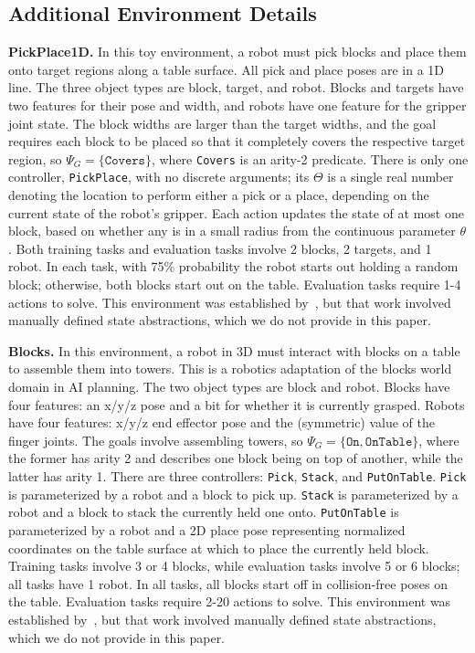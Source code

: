 \subsection{Additional Environment Details}
\label{app:details}

\begin{tightlist}
    \item \textbf{PickPlace1D.} In this toy environment, a robot must pick blocks and place them onto target regions along a table surface. All pick and place poses are in a 1D line. The three object types are block, target, and robot. Blocks and targets have two features for their pose and width, and robots have one feature for the gripper joint state. The block widths are larger than the target widths, and the goal requires each block to be placed so that it completely covers the respective target region, so $\Psi_G = \{\texttt{Covers}\}$, where \texttt{Covers} is an arity-2 predicate. There is only one controller, \texttt{PickPlace}, with no discrete arguments; its $\Theta$ is a single real number denoting the location to perform either a pick or a place, depending on the current state of the robot's gripper. Each action updates the state of at most one block, based on whether any is in a small radius from the continuous parameter $\theta$. Both training tasks and evaluation tasks involve 2 blocks, 2 targets, and 1 robot. In each task, with 75\% probability the robot starts out holding a random block; otherwise, both blocks start out on the table. Evaluation tasks require 1-4 actions to solve. This environment was established by~\citet{silver2021learning}, but that work involved manually defined state abstractions, which we do not provide in this paper.
    \item \textbf{Blocks.} In this environment, a robot in 3D must interact with blocks on a table to assemble them into towers. This is a robotics adaptation of the blocks world domain in AI planning. The two object types are block and robot. Blocks have four features: an x/y/z pose and a bit for whether it is currently grasped. Robots have four features: x/y/z end effector pose and the (symmetric) value of the finger joints. The goals involve assembling towers, so $\Psi_G = \{\texttt{On}, \texttt{OnTable}\}$, where the former has arity 2 and describes one block being on top of another, while the latter has arity 1. There are three controllers: \texttt{Pick}, \texttt{Stack}, and \texttt{PutOnTable}. \texttt{Pick} is parameterized by a robot and a block to pick up. \texttt{Stack} is parameterized by a robot and a block to stack the currently held one onto. \texttt{PutOnTable} is parameterized by a robot and a 2D place pose representing normalized coordinates on the table surface at which to place the currently held block. Training tasks involve 3 or 4 blocks, while evaluation tasks involve 5 or 6 blocks; all tasks have 1 robot. In all tasks, all blocks start off in collision-free poses on the table. Evaluation tasks require 2-20 actions to solve. This environment was established by~\citet{silver2021learning}, but that work involved manually defined state abstractions, which we do not provide in this paper.

\end{tightlist}

